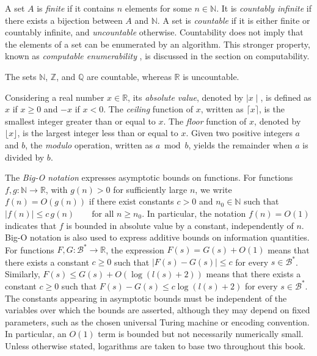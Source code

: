 A set $A$ is \emph{finite} if it contains $n$ elements for some $n \in \mathbb{N}$. It is \emph{countably infinite} if there exists a bijection between $A$ and $\mathbb{N}$. A set is \emph{countable} if it is either finite or countably infinite, and \emph{uncountable} otherwise. Countability does not imply that the elements of a set can be enumerated by an algorithm. This stronger property, known as \emph{computable enumerability} , is discussed in the section on computability.

\begin{example}
The sets $\mathbb{N}$, $\mathbb{Z}$, and $\mathbb{Q}$ are countable, whereas $\mathbb{R}$ is uncountable.
\end{example}

Considering a real number $x \in \mathbb{R}$, its \emph{absolute value}, denoted by $\mid x \mid$, is defined as $x$ if $x \geq 0$ and $-x$ if $x < 0$. The \emph{ceiling} function of $x$, written as $\lceil x \rceil$, is the smallest integer greater than or equal to $x$. The \emph{floor} function of $x$, denoted by $\lfloor x \rfloor$, is the largest integer less than or equal to $x$. Given two positive integers $a$ and $b$, the \emph{modulo} operation, written as $a \bmod b$, yields the remainder when $a$ is divided by $b$.

The \emph{Big-O notation} expresses asymptotic bounds on functions. For functions $f,g:\mathbb{N}\rightarrow\mathbb{R}$, with $g(n)>0$ for sufficiently large $n$, we write $f(n)=O(g(n))$ if there exist constants $c>0$ and $n_0\in\mathbb{N}$ such that $|f(n)|\leq c\,g(n) \qquad\text{for all }n\geq n_0$. In particular, the notation $f(n)=O(1)$ indicates that $f$ is bounded in absolute value by a constant, independently of $n$.  Big-O notation is also used to express additive bounds on information quantities. For functions $F,G:\mathcal{B}^*\rightarrow\mathbb{R}$, the expression $F(s)=G(s)+O(1)$ means that there exists a constant $c\geq 0$ such that $|F(s)-G(s)|\leq c$ for every $s\in\mathcal{B}^*$. Similarly, $F(s)\leq G(s)+O(\log(l(s)+2))$ means that there exists a constant $c\geq 0$ such that $F(s)-G(s)\leq c\log(l(s)+2)$ for every $s\in\mathcal{B}^*$. The constants appearing in asymptotic bounds must be independent of the variables over which the bounds are asserted, although they may depend on fixed parameters, such as the chosen universal Turing machine or encoding convention. In particular, an $O(1)$ term is bounded but not necessarily numerically small. Unless otherwise stated, logarithms are taken to base two throughout this book.

